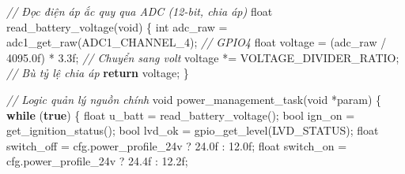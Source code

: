 \documentclass[13pt,a4paper]{extarticle}
\newenvironment{Shaded}{}{}
\newcommand{\BuiltInTok}[1]{\textcolor[rgb]{0.00,0.50,0.00}{#1}}
\newcommand{\CommentTok}[1]{\textcolor[rgb]{0.38,0.63,0.69}{\textit{#1}}}
\newcommand{\ControlFlowTok}[1]{\textcolor[rgb]{0.00,0.44,0.13}{\textbf{#1}}}
\newcommand{\DataTypeTok}[1]{\textcolor[rgb]{0.56,0.13,0.00}{#1}}
\newcommand{\FloatTok}[1]{\textcolor[rgb]{0.25,0.63,0.44}{#1}}
\newcommand{\KeywordTok}[1]{\textcolor[rgb]{0.00,0.44,0.13}{\textbf{#1}}}
\newcommand{\NormalTok}[1]{#1}
\newcommand{\OperatorTok}[1]{\textcolor[rgb]{0.40,0.40,0.40}{#1}}
\renewcommand{\\}{\thesislongtableorignewline\hline}%
\begin{document}
\begin{Shaded}
\begin{Highlighting}[]
\CommentTok{// Đọc điện áp ắc quy qua ADC (12{-}bit, chia áp)}
\DataTypeTok{float}\NormalTok{ read\_battery\_voltage}\OperatorTok{(}\DataTypeTok{void}\OperatorTok{)}
\OperatorTok{\{}
    \DataTypeTok{int}\NormalTok{ adc\_raw }\OperatorTok{=}\NormalTok{ adc1\_get\_raw}\OperatorTok{(}\NormalTok{ADC1\_CHANNEL\_4}\OperatorTok{);}  \CommentTok{// GPIO4}
    \DataTypeTok{float}\NormalTok{ voltage }\OperatorTok{=} \OperatorTok{(}\NormalTok{adc\_raw }\OperatorTok{/} \FloatTok{4095.0}\BuiltInTok{f}\OperatorTok{)} \OperatorTok{*} \FloatTok{3.3}\BuiltInTok{f}\OperatorTok{;}  \CommentTok{// Chuyển sang volt}
\NormalTok{    voltage }\OperatorTok{*=}\NormalTok{ VOLTAGE\_DIVIDER\_RATIO}\OperatorTok{;}              \CommentTok{// Bù tỷ lệ chia áp}
    \ControlFlowTok{return}\NormalTok{ voltage}\OperatorTok{;}
\OperatorTok{\}}

\CommentTok{// Logic quản lý nguồn chính}
\DataTypeTok{void}\NormalTok{ power\_management\_task}\OperatorTok{(}\DataTypeTok{void} \OperatorTok{*}\NormalTok{param}\OperatorTok{)}
\OperatorTok{\{}
    \ControlFlowTok{while} \OperatorTok{(}\KeywordTok{true}\OperatorTok{)} \OperatorTok{\{}
        \DataTypeTok{float}\NormalTok{ u\_batt }\OperatorTok{=}\NormalTok{ read\_battery\_voltage}\OperatorTok{();}
        \DataTypeTok{bool}\NormalTok{ ign\_on  }\OperatorTok{=}\NormalTok{ get\_ignition\_status}\OperatorTok{();}
        \DataTypeTok{bool}\NormalTok{ lvd\_ok  }\OperatorTok{=}\NormalTok{ gpio\_get\_level}\OperatorTok{(}\NormalTok{LVD\_STATUS}\OperatorTok{);}
        \DataTypeTok{float}\NormalTok{ switch\_off }\OperatorTok{=}\NormalTok{ cfg}\OperatorTok{.}\NormalTok{power\_profile\_24v }\OperatorTok{?} \FloatTok{24.0}\BuiltInTok{f} \OperatorTok{:} \FloatTok{12.0}\BuiltInTok{f}\OperatorTok{;}
        \DataTypeTok{float}\NormalTok{ switch\_on  }\OperatorTok{=}\NormalTok{ cfg}\OperatorTok{.}\NormalTok{power\_profile\_24v }\OperatorTok{?} \FloatTok{24.4}\BuiltInTok{f} \OperatorTok{:} \FloatTok{12.2}\BuiltInTok{f}\OperatorTok{;}


\end{Highlighting}
\end{Shaded}
\end{document}
